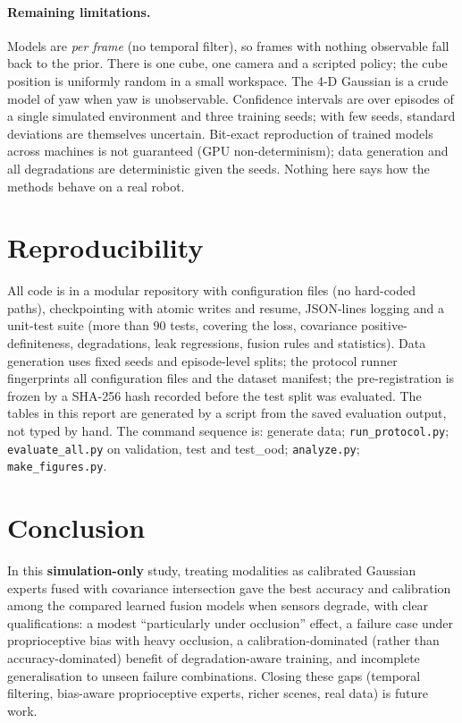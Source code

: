 \documentclass[11pt,a4paper]{article}
\newcommand{\simonly}{\textbf{simulation-only}}
\begin{document}
\paragraph{Remaining limitations.}
Models are \emph{per frame} (no temporal filter), so frames with nothing observable fall back to the prior. There is one cube, one camera and a scripted policy; the cube position is uniformly random in a small workspace. The 4-D Gaussian is a crude model of yaw when yaw is unobservable. Confidence intervals are over episodes of a single simulated environment and three training seeds; with few seeds, standard deviations are themselves uncertain. Bit-exact reproduction of trained models across machines is not guaranteed (GPU non-determinism); data generation and all degradations are deterministic given the seeds. Nothing here says how the methods behave on a real robot.

\section{Reproducibility}
All code is in a modular repository with configuration files (no hard-coded paths), checkpointing with atomic writes and resume, JSON-lines logging and a unit-test suite (more than 90 tests, covering the loss, covariance positive-definiteness, degradations, leak regressions, fusion rules and statistics). Data generation uses fixed seeds and episode-level splits; the protocol runner fingerprints all configuration files and the dataset manifest; the pre-registration is frozen by a SHA-256 hash recorded before the test split was evaluated. The tables in this report are generated by a script from the saved evaluation output, not typed by hand. The command sequence is: generate data; \texttt{run\_protocol.py}; \texttt{evaluate\_all.py} on validation, test and test\_ood; \texttt{analyze.py}; \texttt{make\_figures.py}.

\section{Conclusion}
In this \simonly{} study, treating modalities as calibrated Gaussian experts fused with covariance intersection gave the best accuracy and calibration among the compared learned fusion models when sensors degrade, with clear qualifications: a modest ``particularly under occlusion'' effect, a failure case under proprioceptive bias with heavy occlusion, a calibration-dominated (rather than accuracy-dominated) benefit of degradation-aware training, and incomplete generalisation to unseen failure combinations. Closing these gaps (temporal filtering, bias-aware proprioceptive experts, richer scenes, real data) is future work.
\end{document}
